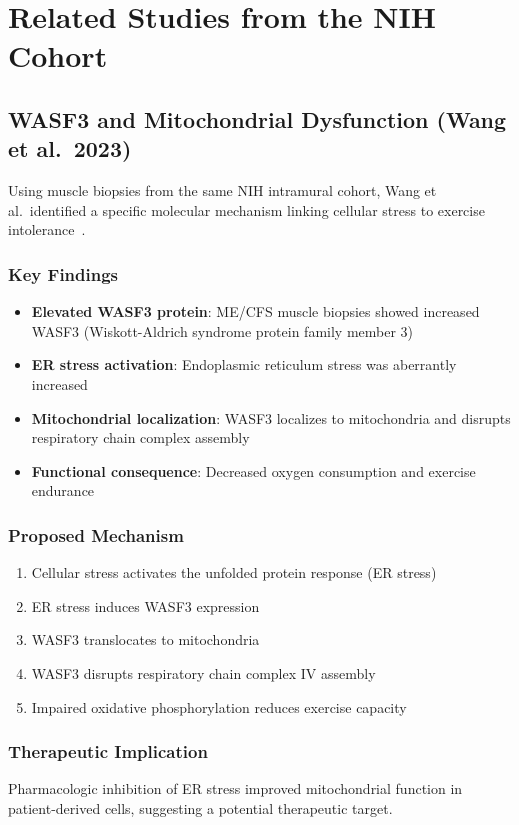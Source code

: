 \section{Related Studies from the NIH Cohort}

\subsection{WASF3 and Mitochondrial Dysfunction (Wang et al.\ 2023)}

Using muscle biopsies from the same NIH intramural cohort, Wang et al.\ identified a specific molecular mechanism linking cellular stress to exercise intolerance~\cite{wang2023wasf3}.

\subsubsection{Key Findings}
\begin{itemize}
    \item \textbf{Elevated WASF3 protein}: ME/CFS muscle biopsies showed increased WASF3 (Wiskott-Aldrich syndrome protein family member 3)
    \item \textbf{ER stress activation}: Endoplasmic reticulum stress was aberrantly increased
    \item \textbf{Mitochondrial localization}: WASF3 localizes to mitochondria and disrupts respiratory chain complex assembly
    \item \textbf{Functional consequence}: Decreased oxygen consumption and exercise endurance
\end{itemize}

\subsubsection{Proposed Mechanism}
\begin{enumerate}
    \item Cellular stress activates the unfolded protein response (ER stress)
    \item ER stress induces WASF3 expression
    \item WASF3 translocates to mitochondria
    \item WASF3 disrupts respiratory chain complex IV assembly
    \item Impaired oxidative phosphorylation reduces exercise capacity
\end{enumerate}

\subsubsection{Therapeutic Implication}
Pharmacologic inhibition of ER stress improved mitochondrial function in patient-derived cells, suggesting a potential therapeutic target.

